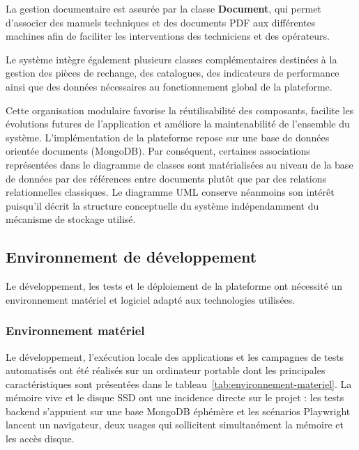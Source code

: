 La gestion documentaire est assurée par la classe \textbf{Document}, qui permet d'associer des manuels techniques et des documents PDF aux différentes machines afin de faciliter les interventions des techniciens et des opérateurs.

Le système intègre également plusieurs classes complémentaires destinées à la gestion des pièces de rechange, des catalogues, des indicateurs de performance ainsi que des données nécessaires au fonctionnement global de la plateforme.

Cette organisation modulaire favorise la réutilisabilité des composants, facilite les évolutions futures de l'application et améliore la maintenabilité de l'ensemble du système.
L'implémentation de la plateforme repose sur une base de données orientée documents (MongoDB). Par conséquent, certaines associations représentées dans le diagramme de classes sont matérialisées au niveau de la base de données par des références entre documents plutôt que par des relations relationnelles classiques. Le diagramme UML conserve néanmoins son intérêt puisqu'il décrit la structure conceptuelle du système indépendamment du mécanisme de stockage utilisé.
\cite{sommerville2016,pressman2020,fowler2003} 

\fi

\subsection{Environnement de développement}

Le développement, les tests et le déploiement de la plateforme ont nécessité un environnement matériel et logiciel adapté aux technologies utilisées.

\subsubsection{Environnement matériel}

Le développement, l'exécution locale des applications et les campagnes de tests automatisés ont été réalisés sur un ordinateur portable dont les principales caractéristiques sont présentées dans le tableau~\ref{tab:environnement-materiel}. La mémoire vive et le disque SSD ont une incidence directe sur le projet : les tests backend s'appuient sur une base MongoDB éphémère et les scénarios Playwright lancent un navigateur, deux usages qui sollicitent simultanément la mémoire et les accès disque.

